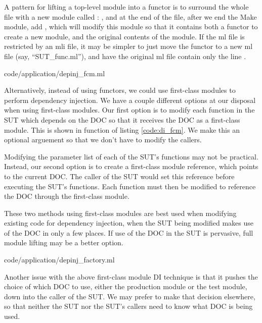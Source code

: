 A pattern for lifting a top-level module into a functor is to surround
the whole file with a new module called : , and at the end of the file, after we end
the Make module, add , which will modify this
module so that it contains both a functor to create a new module, and
the original contents of the module. If the ml file is restricted by
an mli file, it may be simpler to just move the functor to a new ml
file (say, ``SUT\_func.ml''), and have the original ml file contain only
the line .

 {code/application/depinj_fcm.ml}

Alternatively, instead of using functors, we could use first-class
modules to perform dependency injection. We have a couple different
options at our disposal when using first-class modules. Our first
option is to modify each function in the SUT which depends on the DOC
so that it receives the DOC as a first-class module. This is shown in
function  of listing \ref{code:di_fcm}. We make this an
optional arguement so that we don't have to modify the callers.

Modifying the parameter list of each of the SUT's functions may not be
practical. Instead, our second option is to create a first-class
module reference, which points to the current DOC. The caller of the
SUT would set this reference before executing the SUT's
functions. Each function must then be modified to reference the DOC
through the first-class module.

These two methods using first-class modules are best used when
modifying existing code for dependency injection, when the SUT being
modified makes use of the DOC in only a few places. If use of the DOC
in the SUT is pervasive, full module lifting may be a better option.

 {code/application/depinj_factory.ml}

Another issue with the above first-class module DI technique is that
it pushes the choice of which DOC to use, either the production module
or the test module, down into the caller of the SUT. We may prefer to
make that decision elsewhere, so that neither the SUT nor the SUT's
callers need to know what DOC is being used.

